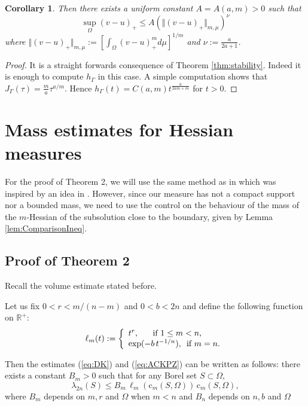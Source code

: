 \documentclass[12pt]{amsart}
\newtheorem{corollary}[theorem]{Corollary}
\theoremstyle{definition}
\numberwithin{theorem}{section}
\numberwithin{equation}{section}
\newcommand{\R}{\mathbb{R}}
\begin{document}
{\begin{corollary}
 Then there exists a uniform constant $A  = A (a,m) >0$ such that
 $$
 \sup_{\Omega} (v-u)_+ \leq A \left(\Vert (v - u)_+\Vert_{m,\mu}\right)^{\nu}
 $$
 where $\Vert (v - u)_+\Vert_{m,\mu} := \left[\int_\Omega  (v - u)_+^m d \mu\right]^{1 \slash m}$ and $\nu := \frac{a }{2 a  +1}$.
\end{corollary}

\begin{proof} It is a straight forwards consequence of Theorem \ref{thm:stability}. Indeed it is enough to compute $h_\Gamma$ in this case. A simple computation shows that $J_\Gamma (\tau) = \frac{m}{a} \tau^{a\slash m}$. Hence 
$h_\Gamma (t) = C(a,m)  t^{\frac{a}{2 a m +m}}$ for $t > 0$.
\end{proof}

\section{ Mass estimates for Hessian measures}

For the proof of Theorem 2, we will use the same method  as in \cite{BZ20} which was inspired by an idea in \cite{KN19}. However, since our measure has not a compact support nor a bounded mass, we need to use the control on the behaviour of the mass of the $m$-Hessian  of the subsolution close to the boundary, given by Lemma \ref{lem:ComparisonIneq}.  
 
 \subsection{Proof of Theorem 2}
Recall the volume estimate stated before.

Let us fix $0 < r < m \slash (n-m)$ and $0 < b < 2 n$ and define the following function on $\R^+$:
\begin{equation}\label{eq:estimatefunction}
\ell_m (t) := \left\{\begin{array}{lcl} 
 t^{r}, \,  \, \, \, \, \, \, \, \, \, \hbox{if} \, \,   1 \leq m < n, \\
   \exp ( -b \, t^{- 1 \slash n}), \, \, \,  \hbox{if} \, \,  m = n.
\end{array}\right.
\end{equation}
 
Then the estimates  (\ref{eq:DK}) and (\ref{eq:ACKPZ}) can be written as follows: there exists a constant $B_m > 0$  such that for any Borel set $S \subset \Omega$, 
 \begin{equation} \label{eq:volumeestimate}
 \lambda_{2 n} (S) \leq B_m  \,  \ell_m \left(\text{c}_m (S,\Omega)\right) \, \text{c}_m (S,\Omega),
  \end{equation}
  where $B_m$ depends on $m,r$ and $\Omega$ when $m<n$ and  $B_n$ depends on $n, b$ and $\Omega$

}
\end{document}
